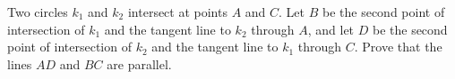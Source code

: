 Two circles $k_1$ and $k_2$ intersect at points $A$ and $C$. Let $B$ be the second point of intersection of $k_1$ and the tangent line to $k_2$ through $A$, and let $D$ be the second point of intersection of $k_2$ and the tangent line to $k_1$ through $C$. Prove that the lines $AD$ and $BC$ are parallel.